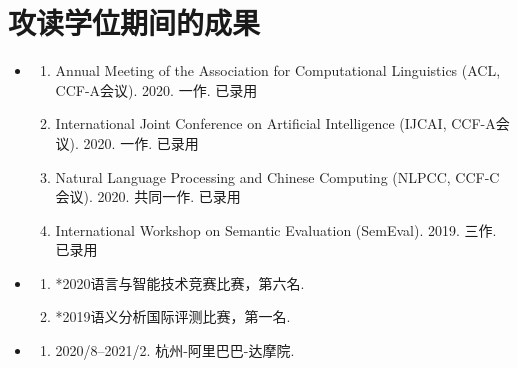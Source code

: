 \chapter{攻读学位期间的成果}

\begin{itemize}
	\setlength{\itemsep}{5pt}
	
	\item \textbf{\heiti{}}
	      \begin{enumerate}
	      	\setlength{\itemsep}{-\itemsep}  %
	      	
	      	\item Annual Meeting of the Association for Computational Linguistics (ACL, CCF-A会议). 2020. 一作. 已录用
	      	\item International Joint Conference on Artificial Intelligence (IJCAI, CCF-A会议). 2020. 一作. 已录用
	      	\item Natural Language Processing and Chinese Computing (NLPCC, CCF-C会议). 2020. 共同一作. 已录用
	      	\item International Workshop on Semantic Evaluation (SemEval). 2019. 三作. 已录用
	      	      
	      \end{enumerate}
	      
	\item \textbf{\heiti{}}
	      \begin{enumerate}
	      	\item *2020语言与智能技术竞赛比赛，第六名.
	      	\item *2019语义分析国际评测比赛，第一名.
	      \end{enumerate}
	      
	\item \textbf{\heiti{}}
	      \begin{enumerate}
	      	\item \textsc{2020/8--2021/2}. 杭州-阿里巴巴-达摩院.
	      \end{enumerate}
	      
\end{itemize}
